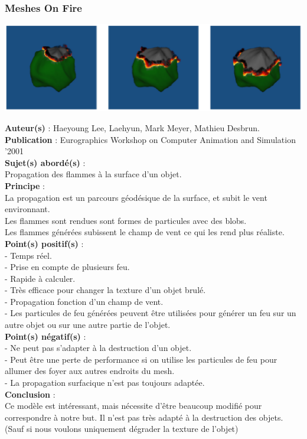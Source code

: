 \documentclass[a4paper,10pt]{article}
\begin{document}
\subsubsection{Meshes On Fire}
    \begin{center}
	\includegraphics[scale=0.5]{Meshes.ps}
    \end{center}
\textbf{Auteur(s)} : Haeyoung Lee, Laehyun, Mark Meyer, Mathieu Desbrun.\\
\textbf{Publication} : Eurographics Workshop on Computer Animation and Simulation '2001 \\
\textbf{Sujet(s) abordé(s)} : \\
	Propagation des flammes à la surface d'un objet.\\
\textbf{Principe} : \\
	La propagation est un parcours géodésique de la surface, et subit le vent environnant.\\	
	Les flammes sont rendues sont formes de particules avec des blobs.\\
	Les flammes générées subissent le champ de vent ce qui les rend plus réaliste.\\
\textbf{Point(s) positif(s)} :\\
	- Temps réel.\\
	- Prise en compte de plusieurs feu.\\
	- Rapide à calculer.\\
	- Très efficace pour changer la texture d'un objet brulé.\\
	- Propagation fonction d'un champ de vent.\\
	- Les particules de feu générées peuvent être utilisées pour générer un feu 
	sur un autre objet ou sur une autre partie de l'objet.\\
\textbf{Point(s) négatif(s)} :\\
	- Ne peut pas s'adapter à la destruction d'un objet.\\
	- Peut être une perte de performance si on utilise les particules de feu pour 
	allumer des foyer aux autres endroits du mesh.\\
	- La propagation surfacique n'est pas toujours adaptée.\\	
\textbf{Conclusion} :\\
	Ce modèle est intéressant, mais nécessite d'être beaucoup modifié pour 
	correspondre à notre but. Il n'est pas très adapté à la destruction des objets. 
	(Sauf si nous voulons uniquement dégrader la texture de l'objet) \\
\end{document}
